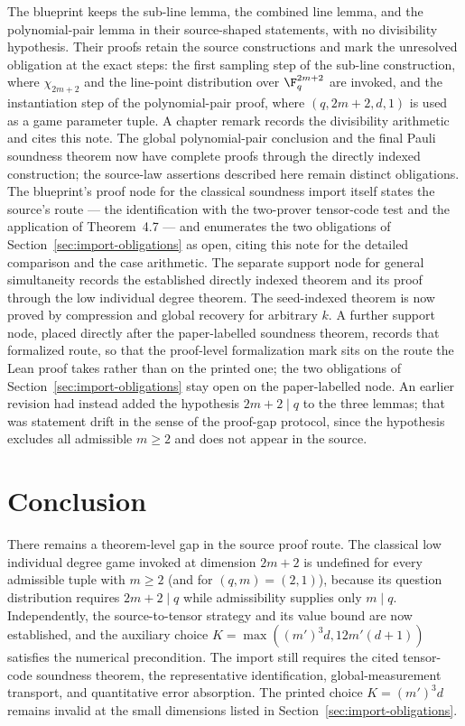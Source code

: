 \documentclass[11pt]{article}
\begin{document}
The blueprint \cite{MIPStarREBlueprint} keeps the sub-line lemma, the
combined line lemma, and the polynomial-pair lemma in their source-shaped
statements, with no divisibility hypothesis.  Their proofs retain the source
constructions and mark the unresolved obligation at the exact steps: the
first sampling step of the sub-line construction, where $\chi_{2m+2}$ and
the line-point distribution over $\F_q^{2m+2}$ are invoked, and the
instantiation step of the polynomial-pair proof, where $(q,2m+2,d,1)$ is
used as a game parameter tuple.  A chapter remark records the divisibility
arithmetic and cites this note. The global polynomial-pair conclusion and
the final Pauli soundness theorem now have complete proofs through the
directly indexed construction; the source-law assertions described here
remain distinct obligations. The blueprint's proof node
for the classical soundness import itself states the source's route --- the
identification with the two-prover tensor-code test and the application of
Theorem~4.7 --- and enumerates the two obligations of
Section~\ref{sec:import-obligations} as open, citing this note for the
detailed comparison and the case arithmetic.  The separate support node for
general simultaneity records the established directly indexed theorem and its
proof through the low individual degree theorem. The seed-indexed theorem
is now proved by compression and global recovery for arbitrary $k$.
A further support node, placed directly after the paper-labelled soundness
theorem, records that formalized route, so that the proof-level formalization
mark sits on the route the Lean proof takes rather than on the printed one;
the two obligations of Section~\ref{sec:import-obligations} stay open on the
paper-labelled node.
An earlier revision had
instead added the hypothesis $2m+2 \mid q$ to the three lemmas; that was
statement drift in the sense of the proof-gap protocol, since the hypothesis
excludes all admissible $m \ge 2$ and does not appear in the source.

\section{Conclusion}

There remains a theorem-level gap in the source proof route.  The classical
low individual degree game invoked at dimension $2m+2$ is undefined for every
admissible tuple with $m \ge 2$ (and for $(q,m)=(2,1)$), because its question
distribution requires $2m+2 \mid q$ while admissibility supplies only
$m \mid q$. Independently, the source-to-tensor strategy and its value bound
are now established, and the auxiliary choice
$K=\max((m')^3d,12m'(d+1))$ satisfies the numerical precondition. The import
still requires the cited tensor-code soundness theorem, the representative
identification, global-measurement transport, and quantitative error absorption.
The printed choice $K=(m')^3d$ remains invalid at the small dimensions listed
in Section~\ref{sec:import-obligations}.
\end{document}
